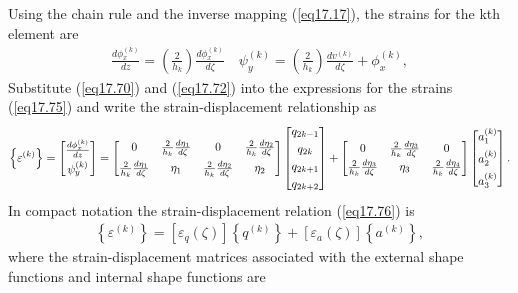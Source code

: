\documentclass{AeroStructure-ERJohnson}
\begin{document}
Using the chain rule and the inverse mapping (\ref{eq17.17}), the strains for the kth element are
\begin{align}\label{eq17.75}
\frac{d \phi_{x}^{(k)}}{d z}=\left(\frac{2}{h_{k}}\right) \frac{d \phi_{x}^{(k)}}{d \zeta} \quad \psi_{y}^{(k)}=\left(\frac{2}{h_{k}}\right) \frac{d v^{(k)}}{d \zeta}+\phi_{x}^{(k)},
\end{align}
Substitute (\ref{eq17.70}) and (\ref{eq17.72}) into the expressions for the strains (\ref{eq17.75}) and write the strain-displacement relationship as
\begin{align}\label{eq17.76}
\left\{\varepsilon^{(k)}\right\}=\left[\begin{array}{@{}c@{}}\frac{d \phi_{x}^{(k)}}{d z} \\[3pt]\psi_{y}^{(k)}\end{array}\right]=\left[\begin{array}{@{}cccc@{}}0 & \frac{2}{h_{k}} \frac{d \eta_{1}}{d \zeta} & 0 & \frac{2}{h_{k}} \frac{d \eta_{2}}{d \zeta} \\[5pt]
\frac{2}{h_{k}} \frac{d \eta_{1}}{d \zeta} & \eta_{1} & \frac{2}{h_{k}} \frac{d \eta_{2}}{d \zeta} & \eta_{2}\end{array}\right]\left[\begin{array}{@{}c@{}}q_{2 k-1} \\[3pt]q_{2 k} \\[3pt]q_{2 k+1} \\[3pt]q_{2 k+2}\end{array}\right]+\left[\begin{array}{@{}ccc@{}}0 & \frac{2}{h_{k}} \frac{d \eta_{3}}{d \zeta} & 0 \\[3pt]
\frac{2}{h_{k}} \frac{d \eta_{3}}{d \zeta} & \eta_{3} & \frac{2}{h_{k}} \frac{d \eta_{4}}{d \zeta}\end{array}\right]\left[\begin{array}{@{}l@{}}a_{1}^{(k)} \\[5pt]a_{2}^{(k)} \\[5pt]a_{3}^{(k)}\end{array}\right].
\end{align}
In compact notation the strain-displacement relation (\ref{eq17.76}) is
\begin{align}\label{eq17.77}
\left\{\varepsilon^{(k)}\right\}=\left[\varepsilon_{q}(\zeta)\right]
\left\{q^{(k)}\right\}+\left[\varepsilon_{a}(\zeta)\right]\left\{a^{(k)}\right\},
\end{align}
where the strain-displacement matrices associated with the external shape functions and internal shape functions are
\end{document}
